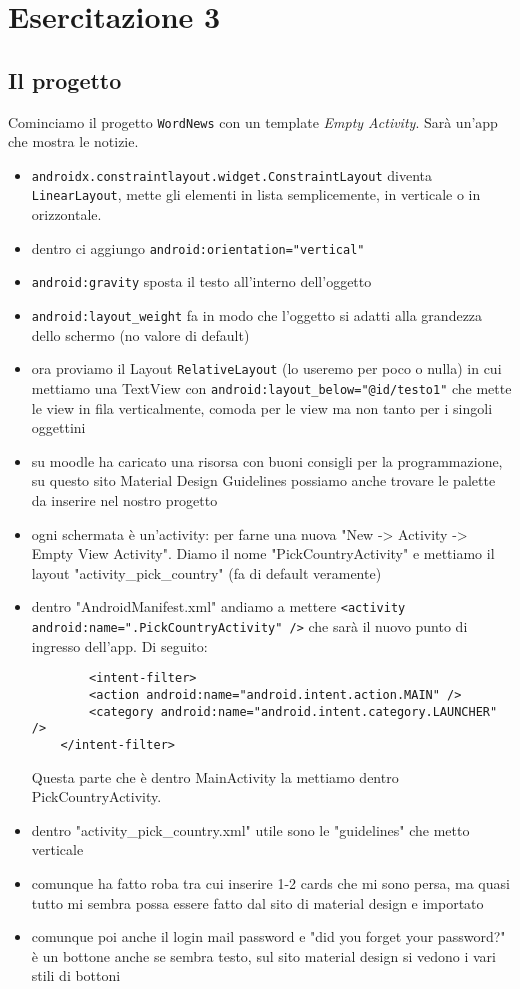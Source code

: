 
\chapter{Esercitazione 3}
\section{Il progetto}
Cominciamo il progetto \texttt{WordNews} con un template \textit{Empty Activity}. Sarà un'app che mostra le notizie.

\begin{itemize}
    \item \texttt{androidx.constraintlayout.widget.ConstraintLayout} diventa \texttt{LinearLayout}, mette gli elementi in lista semplicemente, in verticale o in orizzontale.
    \item dentro ci aggiungo \texttt{android:orientation="vertical"}
    \item \texttt{android:gravity} sposta il testo all'interno dell'oggetto
    \item \texttt{android:layout\_weight} fa in modo che l'oggetto si adatti alla grandezza dello schermo (no valore di default)
    \item ora proviamo il Layout \texttt{RelativeLayout} (lo useremo per poco o nulla) in cui mettiamo una TextView con \texttt{android:layout\_below="@id/testo1"} che mette le view in fila verticalmente, comoda per le view ma non tanto per i singoli oggettini
    \item su moodle ha caricato una risorsa con buoni consigli per la programmazione, su questo sito Material Design Guidelines possiamo anche trovare le palette da inserire nel nostro progetto
    \item ogni schermata è un'activity: per farne una nuova "New -> Activity -> Empty View Activity". Diamo il nome "PickCountryActivity" e mettiamo il layout "activity\_pick\_country" (fa di default veramente)
    \item dentro "AndroidManifest.xml" andiamo a mettere \texttt{<activity android:name=".PickCountryActivity" />} che sarà il nuovo punto di ingresso dell'app. Di seguito:
    \begin{verbatim}        
        <intent-filter>
        <action android:name="android.intent.action.MAIN" />
        <category android:name="android.intent.category.LAUNCHER" />
    </intent-filter> 
    \end{verbatim}
    Questa parte che è dentro MainActivity la mettiamo dentro PickCountryActivity.
    \item dentro "activity\_pick\_country.xml" utile sono le "guidelines" che metto verticale
    \item comunque ha fatto roba tra cui inserire 1-2 cards che mi sono persa, ma quasi tutto mi sembra possa essere fatto dal sito di material design e importato
    \item comunque poi anche il login mail password e "did you forget your password?" è un bottone anche se sembra testo, sul sito material design si vedono i vari stili di bottoni 
\end{itemize}